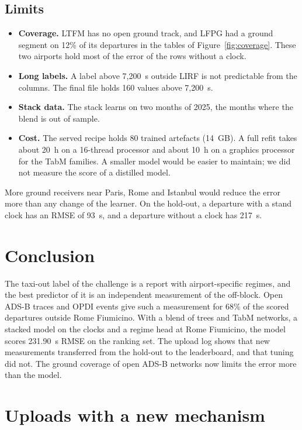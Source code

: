 \documentclass[
  manuscript=article,
  layout=preprint,
  year=2026,
  volume=x,
]{extra/joas}
\begin{document}
\subsection{Limits}

\begin{itemize}
  \item \textbf{Coverage.} LTFM has no open ground track, and LFPG had a ground segment on 12\% of its departures in the tables of Figure~\ref{fig:coverage}. These two airports hold most of the error of the rows without a clock.
  \item \textbf{Long labels.} A label above 7,200~s outside LIRF is not predictable from the columns. The final file holds 160 values above 7,200~s.
  \item \textbf{Stack data.} The stack learns on two months of 2025, the months where the blend is out of sample.
  \item \textbf{Cost.} The served recipe holds 80 trained artefacts (14~GB). A full refit takes about 20~h on a 16-thread processor and about 10~h on a graphics processor for the TabM families. A smaller model would be easier to maintain; we did not measure the score of a distilled model.
\end{itemize}

More ground receivers near Paris, Rome and Istanbul would reduce the error more than any change of the learner. On the hold-out, a departure with a stand clock has an RMSE of 93~s, and a departure without a clock has 217~s.


\section{Conclusion}

The taxi-out label of the challenge is a report with airport-specific regimes, and the best predictor of it is an independent measurement of the off-block. Open ADS-B traces and OPDI events give such a measurement for 68\% of the scored departures outside Rome Fiumicino. With a blend of trees and TabM networks, a stacked model on the clocks and a regime head at Rome Fiumicino, the model scores 231.90~s RMSE on the ranking set. The upload log shows that new measurements transferred from the hold-out to the leaderboard, and that tuning did not. The ground coverage of open ADS-B networks now limits the error more than the model.


\appendix

\section{Uploads with a new mechanism}
\end{document}
